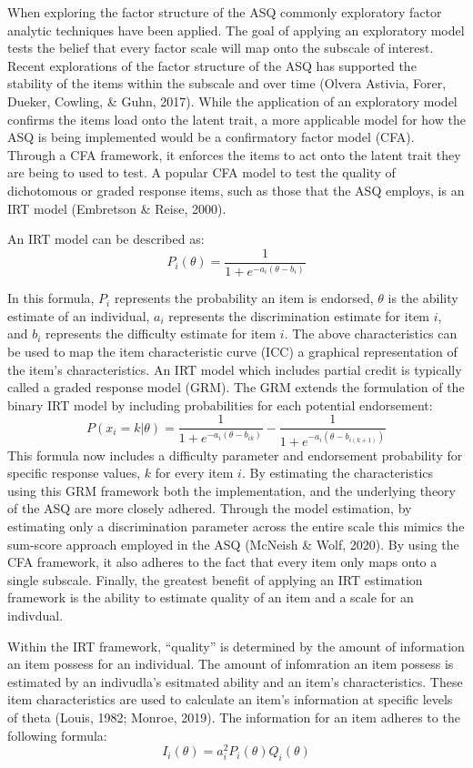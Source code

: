 \documentclass[
  11pt,
]{article}
\begin{document}
When exploring the factor structure of the ASQ commonly exploratory
factor analytic techniques have been applied. The goal of applying an
exploratory model tests the belief that every factor scale will map onto
the subscale of interest. Recent explorations of the factor structure of
the ASQ has supported the stability of the items within the subscale and
over time (Olvera Astivia, Forer, Dueker, Cowling, \& Guhn, 2017). While
the application of an exploratory model confirms the items load onto the
latent trait, a more applicable model for how the ASQ is being
implemented would be a confirmatory factor model (CFA). Through a CFA
framework, it enforces the items to act onto the latent trait they are
being to used to test. A popular CFA model to test the quality of
dichotomous or graded response items, such as those that the ASQ
employs, is an IRT model (Embretson \& Reise, 2000).

An IRT model can be described as:
\[P_i(\theta)=\frac{1}{1+e^{-a_i(\theta-b_i)}}\]

In this formula, \(P_i\) represents the probability an item is endorsed,
\(\theta\) is the ability estimate of an individual, \(a_i\) represents
the discrimination estimate for item \(i\), and \(b_i\) represents the
difficulty estimate for item \(i\). The above characteristics can be
used to map the item characteristic curve (ICC) a graphical
representation of the item's characteristics. An IRT model which
includes partial credit is typically called a graded response model
(GRM). The GRM extends the formulation of the binary IRT model by
including probabilities for each potential endorsement:
\[P(x_{i}= k|\theta)=\frac{1}{1+e^{-a_i(\theta-b_{ik})}} - \frac{1}{1+e^{-a_i(\theta-b_{i(k+1)})} }\]
This formula now includes a difficulty parameter and endorsement
probability for specific response values, \(k\) for every item \(i\). By
estimating the characteristics using this GRM framework both the
implementation, and the underlying theory of the ASQ are more closely
adhered. Through the model estimation, by estimating only a
discrimination parameter across the entire scale this mimics the
sum-score approach employed in the ASQ (McNeish \& Wolf, 2020). By using
the CFA framework, it also adheres to the fact that every item only maps
onto a single subscale. Finally, the greatest benefit of applying an IRT
estimation framework is the ability to estimate quality of an item and a
scale for an indivdual.

Within the IRT framework, ``quality'' is determined by the amount of
information an item possess for an individual. The amount of infomration
an item possess is estimated by an indivudla's esitmated ability and an
item's characteristics. These item characteristics are used to calculate
an item's information at specific levels of theta (Louis, 1982; Monroe,
2019). The information for an item adheres to the following formula:
\[I_i(\theta)=a^2_iP_i(\theta)Q_i(\theta)\]
\end{document}
